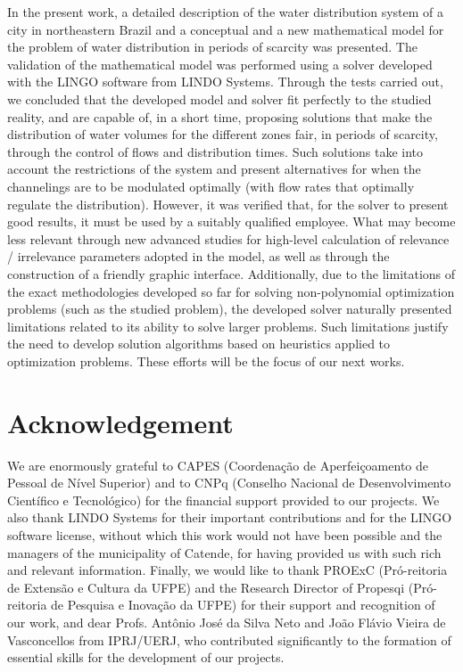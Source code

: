 \documentclass{singlecol}
\theoremstyle{TH}{
\newtheorem{lemma}{Lemma}
\newtheorem{theorem}[lemma]{Theorem}
\newtheorem{corrolary}[lemma]{Corrolary}
\newtheorem{conjecture}[lemma]{Conjecture}
\newtheorem{proposition}[lemma]{Proposition}
\newtheorem{claim}[lemma]{Claim}
\newtheorem{stheorem}[lemma]{Wrong Theorem}
\newtheorem{algorithm}{Algorithm}
}
\theoremstyle{THrm}{
\newtheorem{definition}{Definition}[section]
\newtheorem{question}{Question}[section]
\newtheorem{remark}{Remark}
\newtheorem{scheme}{Scheme}
}
\theoremstyle{THhit}{
\newtheorem{case}{Case}[section]
}
\begin{document}
In the present work, a detailed description of the water distribution system of a city in northeastern Brazil and a conceptual and a new mathematical model for the problem of water distribution in periods of scarcity was presented. The validation of the mathematical model was performed using a solver developed with the LINGO software from LINDO Systems. Through the tests carried out, we concluded that the developed model and solver fit perfectly to the studied reality, and are capable of, in a short time, proposing solutions that make the distribution of water volumes for the different zones fair, in periods of scarcity, through the control of flows and distribution times. Such solutions take into account the restrictions of the system and present alternatives for when the channelings are to be modulated optimally (with flow rates that optimally regulate the distribution). However, it was verified that, for the solver to present good results, it must be used by a suitably qualified employee. What may become less relevant through new advanced studies for high-level calculation of relevance / irrelevance parameters adopted in the model, as well as through the construction of a friendly graphic interface.  Additionally, due to the limitations of the exact methodologies developed so far for solving non-polynomial optimization problems (such as the studied problem), the developed solver naturally presented limitations related to its ability to solve larger problems. Such limitations justify the need to develop solution algorithms based on heuristics applied to optimization problems. These efforts will be the focus of our next works.

\section*{Acknowledgement}
\label{sec:acknowledgement}

We are enormously grateful to CAPES (Coordenação de Aperfeiçoamento de Pessoal de Nível Superior) and to CNPq (Conselho Nacional de Desenvolvimento Científico e Tecnológico) for the financial support provided to our projects. We also thank LINDO Systems for their important contributions and for the LINGO software license, without which this work would not have been possible and the managers of the municipality of Catende, for having provided us with such rich and relevant information. Finally, we would like to thank PROExC (Pró-reitoria de Extensão e Cultura da UFPE) and the Research Director of Propesqi (Pró-reitoria de Pesquisa e Inovação da UFPE) for their support and recognition of our work, and dear Profs. Antônio José da Silva Neto and João Flávio Vieira de Vasconcellos from IPRJ/UERJ, who contributed significantly to the formation of essential skills for the development of our projects. 
\end{document}
